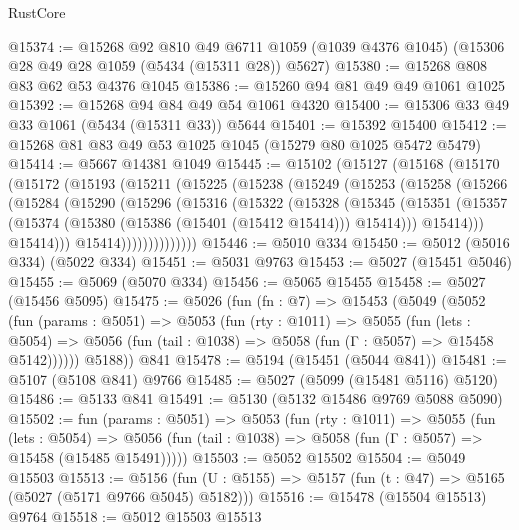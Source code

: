 \begin{lexlean}{RustCore}
\begin{coremodule}
@15374 := @15268
    @92
    @810
    @49
    @6711
    @1059
    (@1039 @4376 @1045)
    (@15306 @28 @49 @28 @1059 (@5434 (@15311 @28)) @5627)
@15380 := @15268 @808 @83 @62 @53 @4376 @1045
@15386 := @15260 @94 @81 @49 @49 @1061 @1025
@15392 := @15268 @94 @84 @49 @54 @1061 @4320
@15400 := @15306 @33 @49 @33 @1061 (@5434 (@15311 @33)) @5644
@15401 := @15392 @15400
@15412 := @15268 @81 @83 @49 @53 @1025 @1045 (@15279 @80 @1025 @5472 @5479)
@15414 := @5667 @14381 @1049
@15445 := @15102
    (@15127
      (@15168
        (@15170
          (@15172
            (@15193
              (@15211
                (@15225
                  (@15238
                    (@15249
                      (@15253
                        (@15258
                          (@15266
                            (@15284
                              (@15290
                                (@15296
                                  (@15316
                                    (@15322
                                      (@15328
                                        (@15345
                                          (@15351
                                            (@15357
                                              (@15374
                                                (@15380 (@15386 (@15401 (@15412 @15414))) @15414)))
                                            @15414)))
                                      @15414)))
                                @15414))))))))))))))
@15446 := @5010 @334
@15450 := @5012 (@5016 @334) (@5022 @334)
@15451 := @5031 @9763
@15453 := @5027 (@15451 @5046)
@15455 := @5069 (@5070 @334)
@15456 := @5065 @15455
@15458 := @5027 (@15456 @5095)
@15475 := @5026
    (fun (fn : @7) =>
    @15453
      (@5049
        (@5052
          (fun (params : @5051) =>
          @5053
            (fun (rty : @1011) =>
            @5055
              (fun (lets : @5054) =>
              @5056 (fun (tail : @1038) => @5058 (fun (Γ : @5057) => @15458 @5142))))))
        @5188))
    @841
@15478 := @5194 (@15451 (@5044 @841))
@15481 := @5107 (@5108 @841) @9766
@15485 := @5027 (@5099 (@15481 @5116) @5120)
@15486 := @5133 @841
@15491 := @5130 (@5132 @15486 @9769 @5088 @5090)
@15502 := fun (params : @5051) =>
  @5053
    (fun (rty : @1011) =>
    @5055
      (fun (lets : @5054) =>
      @5056 (fun (tail : @1038) => @5058 (fun (Γ : @5057) => @15458 (@15485 @15491)))))
@15503 := @5052 @15502
@15504 := @5049 @15503
@15513 := @5156
    (fun (U : @5155) => @5157 (fun (t : @47) => @5165 (@5027 (@5171 @9766 @5045) @5182)))
@15516 := @15478 (@15504 @15513) @9764
@15518 := @5012 @15503 @15513

\end{coremodule}
\end{lexlean}
